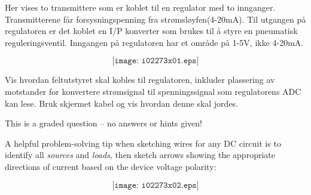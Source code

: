 

Her vises to transmittere som er koblet til en regulator med to innganger. Transmitterene får forsysningspenning fra strømsløyfen(4-20mA). Til utgangen på regulatoren er det koblet en I/P konverter som brukes til å styre en pneumatisk reguleringsventil. Inngangen på regulatoren har et område på 1-5V, ikke 4-20mA. 

$$\texttt{[image: i02273x01.eps]}$$

Vis hvordan feltutstyret skal kobles til regulatoren, inkluder plassering av motstander for konvertere strømsignal til spenningssignal som regulatorens ADC kan lese. Bruk skjermet kabel og vis hvordan denne skal jordes. 


\vfil 

\eject






This is a graded question -- no answers or hints given!







A helpful problem-solving tip when sketching wires for any DC circuit is to identify all {\it sources} and {\it loads}, then sketch arrows showing the appropriate directions of current based on the device voltage polarity:

$$\texttt{[image: i02273x02.eps]}$$




